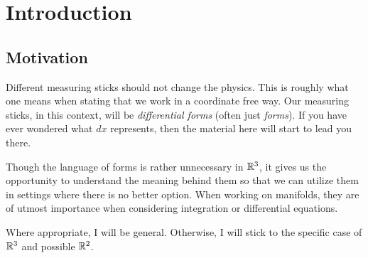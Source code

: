 
\section{Introduction}

\subsection{Motivation}
Different measuring sticks should not change the physics.  This is roughly what one means when stating that we work in a coordinate free way.  Our measuring sticks, in this context, will be \emph{differential forms} (often just \emph{forms}). If you have ever wondered what $dx$ represents, then the material here will start to lead you there. 

Though the language of forms is rather unnecessary in $\mathbb{R}^3$, it gives us the opportunity to understand the meaning behind them so that we can utilize them in settings where there is no better option.  When working on manifolds, they are of utmost importance when considering integration or differential equations.  

Where appropriate, I will be general.  Otherwise, I will stick to the specific case of $\mathbb{R}^3$ and possible $\mathbb{R}^2$.

